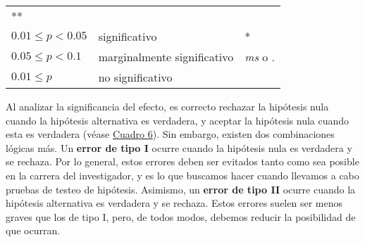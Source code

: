 \documentclass[12pt,spanish,a4paper,]{article}
\begin{document}
\begin{longtable}[]{@{}lll@{}}
\begin{minipage}[t]{0.16\columnwidth}
**\strut
\end{minipage}\tabularnewline
\begin{minipage}[t]{0.30\columnwidth}\raggedright
\(0.01 \leq p < 0.05\)\strut
\end{minipage} & \begin{minipage}[t]{0.38\columnwidth}\raggedright
significativo\strut
\end{minipage} & \begin{minipage}[t]{0.16\columnwidth}\raggedright
*\strut
\end{minipage}\tabularnewline
\begin{minipage}[t]{0.30\columnwidth}\raggedright
\(0.05 \leq p < 0.1\)\strut
\end{minipage} & \begin{minipage}[t]{0.38\columnwidth}\raggedright
marginalmente significativo\strut
\end{minipage} & \begin{minipage}[t]{0.16\columnwidth}\raggedright
\emph{ms} o .\strut
\end{minipage}\tabularnewline
\begin{minipage}[t]{0.30\columnwidth}\raggedright
\(0.01 \leq p\)\strut
\end{minipage} & \begin{minipage}[t]{0.38\columnwidth}\raggedright
no significativo\strut
\end{minipage} & \begin{minipage}[t]{0.16\columnwidth}\raggedright
\strut
\end{minipage}\tabularnewline
\bottomrule
\end{longtable}

Al analizar la significancia del efecto, es correcto rechazar la
hipótesis nula cuando la hipótesis alternativa es verdadera, y aceptar
la hipótesis nula cuando esta es verdadera (véase
\protect\hyperlink{errores}{Cuadro 6}). Sin embargo, existen dos
combinaciones lógicas más. Un \textbf{error de tipo I} ocurre cuando la
hipótesis nula es verdadera y se rechaza. Por lo general, estos errores
deben ser evitados tanto como sea posible en la carrera del
investigador, y es lo que buscamos hacer cuando llevamos a cabo pruebas
de testeo de hipótesis. Asimismo, un \textbf{error de tipo II} ocurre
cuando la hipótesis alternativa es verdadera y se rechaza. Estos errores
suelen ser menos graves que los de tipo I, pero, de todos modos, debemos
reducir la posibilidad de que ocurran.

\hypertarget{errores}{}
\end{document}
